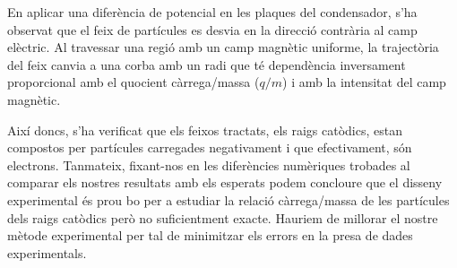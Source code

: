 \documentclass[11pt]{article}
\begin{document}
En aplicar una diferència de potencial en les plaques del condensador, s'ha observat que el feix de partícules es desvia en la direcció contrària al camp elèctric. Al travessar una regió amb un camp magnètic uniforme, la trajectòria del feix canvia a una corba amb un radi que té dependència inversament proporcional amb el quocient càrrega/massa ($q/m$) i amb la intensitat del camp magnètic. 

Així doncs, s'ha verificat que els feixos tractats, els raigs catòdics, estan compostos per partícules carregades negativament i que efectivament, són electrons. Tanmateix, fixant-nos en les diferències numèriques trobades al comparar els nostres resultats amb els esperats podem concloure que el disseny experimental és prou bo per a estudiar la relació càrrega/massa de les partícules dels raigs catòdics però no suficientment exacte. Hauriem de millorar el nostre mètode experimental per tal de minimitzar els errors en la presa de dades experimentals.
\newpage
{}
\end{document}
